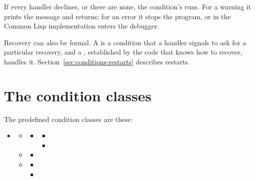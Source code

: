 \noindent If every handler declines, or there are none, the condition's
 runs. For a warning it prints the message and
returns; for an error it stops the program, or in the Common Lisp
implementation enters the debugger.

Recovery can also be formal. A  is a condition that a
handler signals to ask for a particular recovery, and a , established by the code that knows how to recover, handles it.
Section~\ref{sec:conditions-restarts} describes restarts.

\section{The condition classes}\label{sec:conditions-classes}

The predefined condition classes are these:

\begin{itemize}[nosep]
\item {}
  \begin{itemize}[nosep]
  \item {}
    \begin{itemize}[nosep]
    \item {}
      \begin{itemize}[nosep]
      \item {}
      \item {}
      \end{itemize}
    \end{itemize}
  \item {}
    \begin{itemize}[nosep]
    \item {}
    \end{itemize}
  \item {}
    \begin{itemize}[nosep]
    \item {}
    \item {}
    \end{itemize}
  \end{itemize}
\end{itemize}

